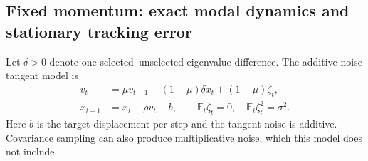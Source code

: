 \subsection{Fixed momentum: exact modal dynamics and stationary tracking error}
\label{app:fixed-momentum-dynamics}
Let $\delta>0$ denote one selected--unselected eigenvalue difference.
The additive-noise tangent model is
\begin{align}
 v_t&=\mu v_{t-1}-(1-\mu)\delta x_t+(1-\mu)\zeta_t,\\
 x_{t+1}&=x_t+\rho v_t-b,\qquad
 \mathbb E_t\zeta_t=0,\quad\mathbb E_t\zeta_t^2=\sigma^2.
 \label{eq:tangent-momentum-model}
\end{align}
Here $b$ is the target displacement per step and the tangent noise is
additive. Covariance sampling can also produce multiplicative noise,
which this model does not include.

